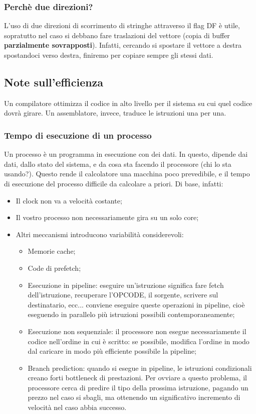 \documentclass[a4paper,11pt]{article}
\begin{document}
\subsubsection{Perchè due direzioni?}
L'uso di due direzioni di scorrimento di stringhe attraverso il flag DF è utile, sopratutto nel caso si debbano fare traslazioni del vettore (copia di buffer \textbf{parzialmente sovrapposti}).
Infatti, cercando si spostare il vettore a destra spostandoci verso destra, finiremo per copiare sempre gli stessi dati.

\subsection{Note sull'efficienza}
Un compilatore ottimizza il codice in alto livello per il sistema su cui quel codice dovrà girare.
Un assemblatore, invece, traduce le istruzioni una per una.

\subsubsection{Tempo di esecuzione di un processo}
Un processo è un programma in esecuzione con dei dati.
In questo, dipende dai dati, dallo stato del sistema, e da cosa sta facendo il processore (chi lo sta usando?).
Questo rende il calcolatore una macchina poco prevedibile, e il tempo di esecuzione del processo difficile da calcolare a priori. Di base, infatti:
\begin{itemize}
	\item Il clock non va a velocità costante;
	\item Il vostro processo non necessariamente gira su un solo core;
	\item Altri meccanismi introducono variabilità considerevoli:
		\begin{itemize}
			\item Memorie cache;
			\item Code di prefetch;
			\item Esecuzione in pipeline: eseguire un'istruzione significa fare fetch dell'istruzione, recuperare l'OPCODE, il sorgente, scrivere sul destinatario, ecc... conviene eseguire queste operazioni in pipeline, cioè eseguendo in parallelo più istruzioni possibili contemporaneamente;
			\item Esecuzione non sequenziale: il processore non esegue necessariamente il codice nell'ordine in cui è scritto: se possibile, modifica l'ordine in modo dal caricare in modo più efficiente possibile la pipeline;
			\item Branch prediction: quando si esegue in pipeline, le istruzioni condizionali creano forti bottleneck di prestazioni. Per ovviare a questo problema, il processore cerca di predire il tipo della prossima istruzione, pagando un prezzo nel caso si sbagli, ma ottenendo un significativo incremento di velocità nel caso abbia successo.
		\end{itemize}
\end{itemize}
\end{document}
